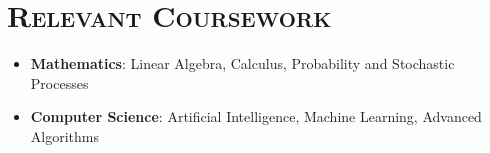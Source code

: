 \documentclass{article}
\begin{document}
\begin{itemize}[leftmargin=0em]
%

\end{itemize}

\section*{\textsc{\textbf{Relevant Coursework}}}
\begin{itemize}[itemsep=0em, leftmargin=0.7em]
\item[]
    \textbf{Mathematics}: Linear Algebra, Calculus, Probability and Stochastic Processes
\item[]
    \textbf{Computer Science}: Artificial Intelligence, Machine Learning, Advanced Algorithms
\end{itemize}


\end{document}

